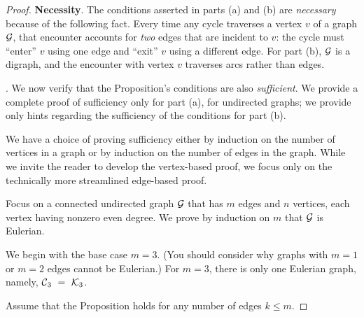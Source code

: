 \begin{proof}
{\bf Necessity}.
The conditions asserted in parts (a) and (b) are {\em necessary} because of the following fact.  Every time any cycle traverses a vertex $v$ of a graph $\mbox{$\cal G$}$, that encounter accounts for {\em two} edges that are incident to $v$: the cycle must ``enter'' $v$ using one edge and ``exit'' $v$ using a different edge.   For part (b), $\mbox{$\cal G$}$ is a digraph, and the encounter with vertex $v$ traverses arcs rather than edges.

\medskip

.
We now verify that the Proposition's conditions are also {\em sufficient}.  We provide  a complete proof of sufficiency only for part (a), for undirected graphs; we provide only hints regarding the sufficiency of the conditions for part (b).

\smallskip

We have a choice of proving sufficiency either by induction on the number of vertices in a 
graph or by induction on the number of edges in the graph.  While we invite the reader to 
develop the vertex-based proof, we focus only on the technically more streamlined edge-based proof. 

\medskip

Focus on a connected undirected graph $\mbox{$\cal G$}$ that has $m$ edges and $n$ vertices, each vertex having nonzero even degree.  We prove by induction on $m$ that $\mbox{$\cal G$}$ is Eulerian.

\smallskip

We begin with the base case $m=3$.  (You should consider why graphs with $m=1$ or $m=2$ edges cannot be Eulerian.)  For $m=3$, there is only one Eulerian graph, namely, 
$\mbox{$\cal C$}_3 \ = \ \mbox{$\cal K$}_3$.

\smallskip

Assume that the Proposition holds for any number of edges $k \leq m$.

\smallskip


\end{proof}
